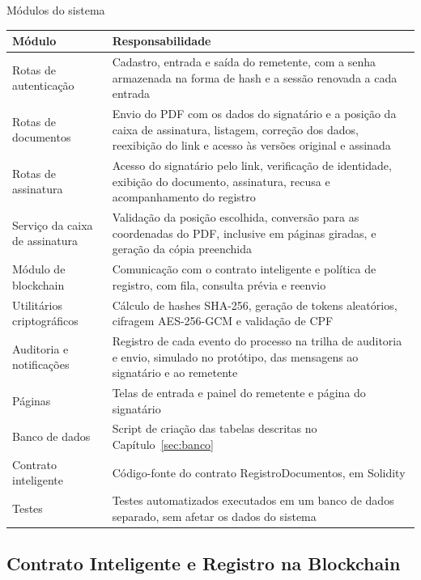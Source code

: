 \documentclass[
    12pt,
    a4paper,
    oneside,
    chapter=TITLE,
    section=TITLE,
    subsection=TITLE,
    subsubsection=TITLE,
    sumario=tradicional,
    english,
    brazil
]{abntex2}
\begin{document}
\begin{quadro}[htb]
    \caption{Módulos do sistema}
    \label{quadro:modulos}
    \centering
    \small
    \begin{tabular}{L{4.0cm}L{10.8cm}}
        \toprule
        \textbf{Módulo} & \textbf{Responsabilidade} \\
        \midrule
        Rotas de autenticação & Cadastro, entrada e saída do remetente, com a senha armazenada na forma de hash e a sessão renovada a cada entrada \\
        Rotas de documentos & Envio do PDF com os dados do signatário e a posição da caixa de assinatura, listagem, correção dos dados, reexibição do link e acesso às versões original e assinada \\
        Rotas de assinatura & Acesso do signatário pelo link, verificação de identidade, exibição do documento, assinatura, recusa e acompanhamento do registro \\
        Serviço da caixa de assinatura & Validação da posição escolhida, conversão para as coordenadas do PDF, inclusive em páginas giradas, e geração da cópia preenchida \\
        Módulo de blockchain & Comunicação com o contrato inteligente e política de registro, com fila, consulta prévia e reenvio \\
        Utilitários criptográficos & Cálculo de hashes SHA-256, geração de tokens aleatórios, cifragem AES-256-GCM e validação de CPF \\
        Auditoria e notificações & Registro de cada evento do processo na trilha de auditoria e envio, simulado no protótipo, das mensagens ao signatário e ao remetente \\
        Páginas & Telas de entrada e painel do remetente e página do signatário \\
        Banco de dados & Script de criação das tabelas descritas no Capítulo~\ref{sec:banco} \\
        Contrato inteligente & Código-fonte do contrato RegistroDocumentos, em Solidity \\
        Testes & Testes automatizados executados em um banco de dados separado, sem afetar os dados do sistema \\
        \bottomrule
    \end{tabular}
\end{quadro}

\subsection{Contrato Inteligente e Registro na Blockchain}
\label{sec:impl-contrato}
\end{document}

